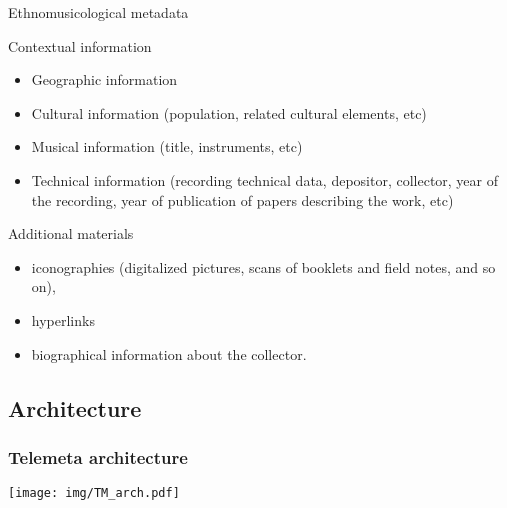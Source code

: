 \documentclass[final, hyperref, table]{beamer}
\begin{document}
\begin{frame}[label=telemeta_metadata]{Ethnomusicological metadata}
\begin{block}{Contextual information}
  \begin{itemize}
  \item Geographic information
  \item Cultural information (population, related cultural elements, etc)
  \item Musical information (title, instruments, etc)
  \item Technical information (recording technical data, depositor, collector, year of the recording, year of publication of papers describing the work, etc)
  \end{itemize}
\end{block}

\begin{block}{Additional materials}
  \begin{itemize}
  \item iconographies (digitalized pictures, scans of booklets and
    field notes, and so on),
  \item hyperlinks
  \item biographical information about the collector.
  \end{itemize}
\end{block}

\end{frame}



\subsection{Architecture}
\begin{frame}\frametitle{Telemeta architecture}
  \begin{center}
    \texttt{[image: img/TM\_arch.pdf]}
  \end{center}
\end{frame}
\end{document}
